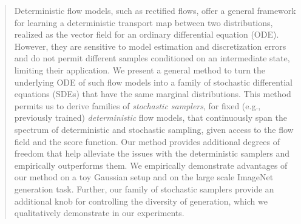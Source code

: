 \begin{abstract}
Deterministic flow models, such as rectified flows, offer a general framework for learning a deterministic transport map between two distributions, realized as the vector field for an ordinary differential equation (ODE).
However, they are sensitive to model estimation and discretization errors and do not permit different samples conditioned on an intermediate state, limiting their application.
We present a general method to turn the underlying ODE of such flow models into a family of stochastic differential equations (SDEs) that have the same marginal distributions.
This method permits us to derive families of \emph{stochastic samplers}, for fixed (e.g., previously trained) \emph{deterministic} flow models, that continuously span the spectrum of deterministic and stochastic sampling, given access to the flow field and the score function.
Our method provides additional degrees of freedom that help alleviate the issues with the deterministic samplers and empirically outperforms them.
We empirically demonstrate advantages of our method on a toy Gaussian setup and on the large scale ImageNet generation task.
Further, our family of stochastic samplers provide an additional knob for controlling the diversity of generation, which we qualitatively demonstrate in our experiments.
\end{abstract}
